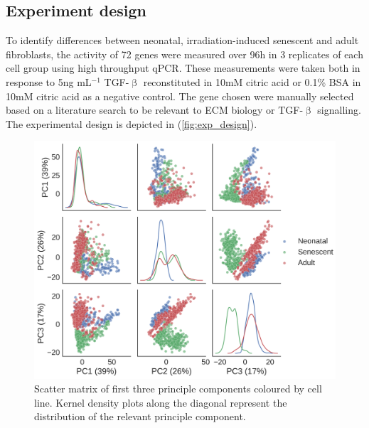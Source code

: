 \documentclass[alpha-refs]{wiley-article}
\newcommand{\tgf}{TGF-$\upbeta$}
\begin{document}
\subsection{Experiment design}
To identify differences between neonatal, irradiation-induced senescent and adult fibroblasts, the activity of 72 genes were measured over 96h in 3 replicates of each cell group using high throughput qPCR. These measurements were taken both in response to 5ng mL$^{-1}$ \tgf{} reconstituted in 10mM citric acid or 0.1\% BSA in 10mM citric acid as a negative control. The gene chosen were manually selected based on a literature search to be relevant to ECM biology or \tgf{} signalling. The experimental design is depicted in (\cref{fig:exp_design}).
%
\begin{figure}[t]
	\centering
	\includegraphics[width=\textwidth]{img/qc/cell_line}
	\caption{Scatter matrix of first three principle components coloured by cell line. Kernel density plots along the diagonal represent the distribution of the relevant principle component.}
	\label{fig:qc:cell_line}
\end{figure}
%
\end{document}
